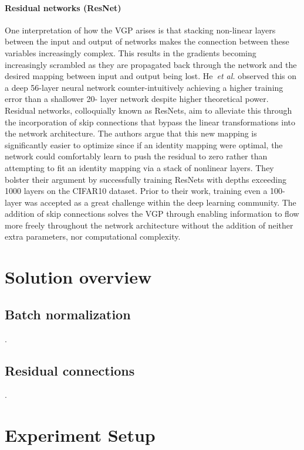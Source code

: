 \documentclass{article}
\begin{document}
\paragraph{Residual networks (ResNet)}\cite{he2016deep}
One interpretation of how the VGP arises is that stacking non-linear layers
between the input and output of networks makes the
connection between these variables increasingly
complex. This results in the gradients becoming
increasingly scrambled as they are propagated back through
the network and the desired mapping between input and output
being lost. He~\emph{et al.} observed this on 
a deep 56-layer neural network counter-intuitively
achieving a higher training error than a shallower 20-
layer network despite higher theoretical power.
Residual networks, colloquially
known as ResNets, aim to alleviate this through the
incorporation of skip connections that bypass the linear
transformations into the network architecture. The authors
argue that this new mapping is significantly easier
to optimize since if an identity mapping were optimal, the
network could comfortably learn to push the residual to
zero rather than attempting to fit an identity mapping via
a stack of nonlinear layers. They bolster their argument
by successfully training ResNets with depths exceeding
1000 layers on the CIFAR10 dataset.
Prior to their work, training even a 100-layer was accepted
as a great challenge within the deep learning community.
The addition of skip connections solves the VGP through
enabling information to flow more freely throughout the
network architecture without the addition of neither extra
parameters, nor computational complexity.

\section{Solution overview}
\subsection{Batch normalization}

\questionTwo.


\subsection{Residual connections}

\questionThree.


\section{Experiment Setup}
\end{document}
